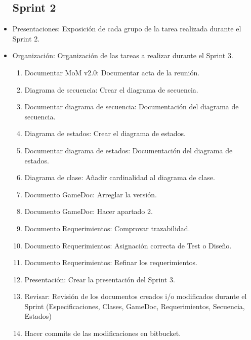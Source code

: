 \begin{itemize}
\subsection{Sprint 2}
\item Presentaciones: Exposición de cada grupo de la tarea realizada durante el Sprint 2.
\item Organización: Organización de las tareas a realizar durante el Sprint 3.
\begin{enumerate}
	\item Documentar MoM v2.0: Documentar acta de la reunión.
	\item Diagrama de secuencia: Crear el diagrama de secuencia.
	\item Documentar diagrama de secuencia: Documentación del diagrama de secuencia.
	\item Diagrama de estados: Crear el diagrama de estados.
	\item Documentar diagrama de estados: Documentación del diagrama de estados.
	\item Diagrama de clase: Añadir cardinalidad al diagrama de clase.
	\item Documento GameDoc: Arreglar la versión.
	\item Documento GameDoc: Hacer apartado 2.
	\item Documento Requerimientos: Comprovar trazabilidad.
	\item Documento Requerimientos: Asignación correcta de Test o Diseño.
	\item Documento Requerimientos: Refinar los requerimientos.
	\item Presentación: Crear la presentación del Sprint 3.
	\item Revisar: Revisión de los documentos creados i/o modificados durante el Sprint (Especificaciones, Clases, GameDoc, Requerimientos, Secuencia, Estados)
	\item Hacer commits de las modificaciones en bitbucket.
\end{enumerate}




\end{itemize}
